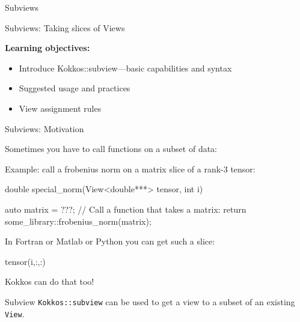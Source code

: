 \begin{frame}[fragile]{Subviews}

  {\Huge Subviews: Taking slices of Views}

  \vspace{20pt}

  \textbf{Learning objectives:}
  \begin{itemize}
    \item{Introduce Kokkos::subview---basic capabilities and syntax}
    \item{Suggested usage and practices}
    \item{View assignment rules}
  \end{itemize}

  \vspace{-20pt}

\end{frame}


\begin{frame}[fragile]{Subviews: Motivation}

  Sometimes you have to call functions on a subset of data:

  \vspace{5pt}

  \pause
  Example: call a frobenius norm on a matrix slice of a rank-3 tensor:
  \begin{code}[]
double special_norm(View<double***> tensor, int i) {

  auto matrix = ???;
  // Call a function that takes a matrix:
  return some_library::frobenius_norm(matrix);
}
    \end{code}
    \pause

    In Fortran or Matlab or Python you can get such a slice:

    \begin{code}
    tensor(i,:,:)
    \end{code}

    \pause
    Kokkos can do that too!
    \begin{block}{Subview}
     \texttt{Kokkos::subview} can be used to get a view to a subset of an existing \texttt{View}.
     \end{block}

\end{frame}



